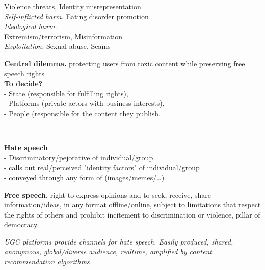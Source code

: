 \documentclass[8pt, a4paper]{extarticle}
\begin{document}
\begin{minipage}[t]{0.49\textwidth}
{\begin{minipage}[t]{1\textwidth}
\begin{minipage}[t]{0.47\textwidth}
				Violence threats, Identity misrepresentation\\
				\textit{Self-inflicted harm.} Eating disorder promotion\\
				\textit{Ideological harm.}\\
				Extremism/terrorism, Misinformation\\
				\textit{Exploitation.} Sexual abuse, Scams
			\end{minipage}
			\begin{minipage}[t]{0.53\textwidth}
				\textbf{Central dilemma.} protecting users from toxic content while preserving free speech rights\\
				\textbf{To decide?} \\
				- State (responsible for fulfilling rights), \\
				- Platforms (private actors with business interests), \\
				- People (responsible for the content they publish.
			\end{minipage}\\
			\begin{minipage}[t]{0.5\textwidth}
				\textbf{Hate speech}\\
				- Discriminatory/pejorative of individual/group\\
				- calls out real/perceived "identity factors" of individual/group\\
				- conveyed through any form of \expression (images/memes/\ldots)
			\end{minipage}
			\begin{minipage}[t]{0.5\textwidth}
				\textbf{Free speech.} right to express opinions and to seek, receive, share information/ideas, in any format offline/online, subject to limitations that respect the rights of others and prohibit incitement to discrimination or violence, pillar of democracy.
			\end{minipage}
			\textit{UGC platforms provide channels for hate speech. Easily produced, shared, anonymous, global/diverse audience, realtime, amplified by content recommendation algorithms}\\[-6px]
			\begin{minipage}[htp]{0.001\textwidth}
			\end{minipage}\hspace*{-8px}
			\begin{minipage}[htp]{0.999\textwidth}
				\begin{minipage}[htp]{0.65\textwidth}

\end{minipage}
\end{minipage}
\end{minipage}}
\end{minipage}
\end{document}
